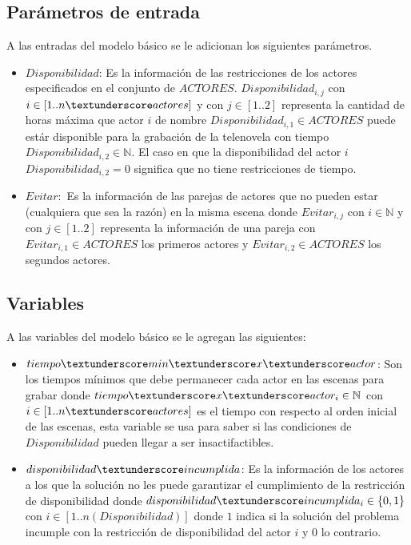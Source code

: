 \documentclass{article}
\begin{document}
\subsection{Parámetros de entrada}
A las entradas del modelo básico se le adicionan los siguientes parámetros.
\begin{itemize}
    \item $Disponibilidad$: Es la información de las restricciones de los actores especificados en el conjunto de $ACTORES$. $Disponibilidad_{i,j}$ con $i \in [1..n\textunderscore actores]$ y con $j \in [1..2]$ representa la cantidad de horas máxima que actor $i$ de nombre $Disponibilidad_{i,1} \in ACTORES$ puede estár disponible para la grabación de la telenovela con tiempo $Disponibilidad_{i,2} \in \mathbb{N} $. El caso en que la disponibilidad del actor $i$  $Disponibilidad_{i,2} = 0$ significa que no tiene restricciones de tiempo.
    \item $Evitar:$ Es la información de las parejas de actores que no 
    pueden estar (cualquiera que sea la razón) en la misma escena donde $Evitar_{i,j}$ con $i \in \mathbb{N}$ y con $j \in [1..2]$ representa la información de una pareja con $Evitar_{i,1} \in ACTORES$ los primeros actores y $Evitar_{i,2} \in ACTORES$ los segundos actores.
\end{itemize}

\subsection{Variables}
A las variables del modelo básico se le agregan las siguientes:
\begin{itemize}
    \item $tiempo\textunderscore min\textunderscore x\textunderscore actor$: Son los tiempos mínimos que debe permanecer cada actor en las escenas para grabar donde $tiempo\textunderscore  x\textunderscore actor_i \in \mathbb{N}$ con $i \in [1..n\textunderscore actores]$ es el tiempo con respecto al orden inicial de las escenas, esta variable se usa para saber si las condiciones de $Disponibilidad$ pueden llegar a ser insactifactibles.
    \item $disponibilidad\textunderscore incumplida$: Es la información de los actores a los que la solución no les puede garantizar el cumplimiento de la restricción de disponibilidad donde $disponibilidad\textunderscore incumplida_i \in \{0,1\}$ con $i \in [1..n(Disponibilidad)]$ donde $1$ indica si la solución del problema incumple con la restricción de disponibilidad del actor $i$ y $0$ lo contrario.
\end{itemize}
\end{document}
